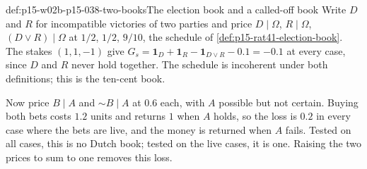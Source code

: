 \begin{hbexample}{def:p15-w02b-p15-038-two-books}{The election book and a called-off book}
Write \(D\) and \(R\) for incompatible victories of two parties and
price \(D\mid\Omega\), \(R\mid\Omega\), \((D\lor R)\mid\Omega\) at
\(1/2\), \(1/2\), \(9/10\), the schedule of
\cref{def:p15-rat41-election-book}. The stakes \((1,1,-1)\) give
\(G_s=\mathbf1_D+\mathbf1_R-\mathbf1_{D\lor R}-0.1=-0.1\) at every
case, since \(D\) and \(R\) never hold together. The schedule is
incoherent under both definitions; this is the ten-cent book.

Now price \(B\mid A\) and \(\sim B\mid A\) at \(0.6\) each, with
\(A\) possible but not certain. Buying both bets costs \(1.2\) units
and returns \(1\) when \(A\) holds, so the loss is \(0.2\) in every
case where the bets are live, and the money is returned when \(A\)
fails. Tested on all cases, this is no Dutch book; tested on the live
cases, it is one. Raising the two prices to sum to one removes this
loss.
\end{hbexample}

